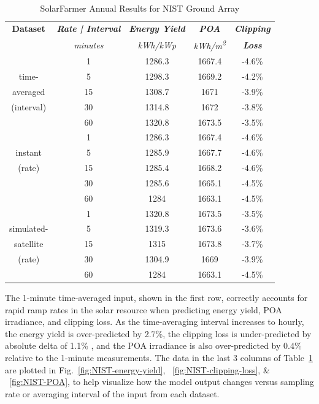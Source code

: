 \documentclass[conference]{IEEEtran}
\begin{document}
\begin{table}[htbp]
\caption{SolarFarmer Annual Results for NIST Ground Array}
\begin{center}
\begin{tabular}{|c|c|c|c|c|}
\hline
\textbf{Dataset} & \textbf{\textit{Rate | Interval}} & \textbf{\textit{Energy Yield}} & \textbf{\textit{POA}} & \textbf{\textit{Clipping}} \\
& \textit{minutes} & \textit{kWh/kWp} & \textit{kWh/m\textsuperscript{2}} & \textbf{\textit{Loss}} \\
\hline
             &  1& 1286.3& 1667.4& -4.6\% \\
time-        &  5& 1298.3& 1669.2& -4.2\% \\
averaged     & 15& 1308.7& 1671  & -3.9\% \\
(interval)   & 30& 1314.8& 1672  & -3.8\% \\
             & 60& 1320.8& 1673.5& -3.5\% \\
\hline
             &  1& 1286.3& 1667.4& -4.6\% \\
instant      &  5& 1285.9& 1667.7& -4.6\% \\
(rate)       & 15& 1285.4& 1668.2& -4.6\% \\
             & 30& 1285.6& 1665.1& -4.5\% \\
             & 60& 1284  & 1663.1& -4.5\% \\
\hline
             &  1& 1320.8& 1673.5& -3.5\% \\
simulated-   &  5& 1319.3& 1673.6& -3.6\% \\
satellite    & 15& 1315  & 1673.8& -3.7\% \\
(rate)       & 30& 1304.9& 1669  & -3.9\% \\
             & 60& 1284  & 1663.1& -4.5\% \\
\hline
\end{tabular}
\label{table:results-summary}
\end{center}
\end{table}

The 1-minute time-averaged input, shown in the first row, correctly accounts for rapid ramp rates in the solar resource when predicting energy yield, POA irradiance, and clipping loss. As the time-averaging interval increases to hourly, the energy yield is over-predicted by 2.7\%, the clipping loss is under-predicted by absolute delta of 1.1\% , and the POA irradiance is also over-predicted by 0.4\% relative to the 1-minute measurements. The data in the last 3 columns of Table~\ref{table:results-summary} are plotted in Fig.~\ref{fig:NIST-energy-yield}, ~\ref{fig:NIST-clipping-loss}, \& ~\ref{fig:NIST-POA}, to help visualize how the model output changes versus sampling rate or averaging interval of the input from each dataset.
\end{document}
